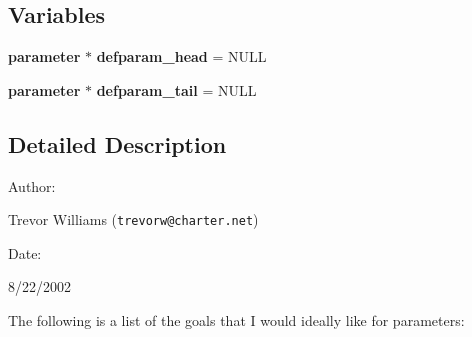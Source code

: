\subsection*{Variables}
\begin{CompactItemize}
\item 
{\bf parameter} $\ast$ {\bf defparam\_\-head} = NULL
\item 
{\bf parameter} $\ast$ {\bf defparam\_\-tail} = NULL
\end{CompactItemize}


\subsection{Detailed Description}


\begin{Desc}
\item[Author: ]\par
Trevor Williams ({\tt trevorw@charter.net}) \end{Desc}
\begin{Desc}
\item[Date: ]\par
8/22/2002\end{Desc}
The following is a list of the goals that I would ideally like for parameters:


